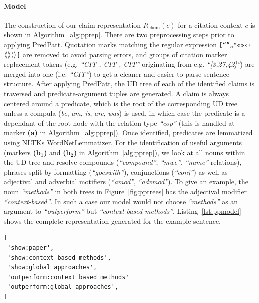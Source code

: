 \paragraph{Model} The construction of our claim representation $R_{\text{claim}}(c)$ for a citation context $c$ is shown in Algorithm~\ref{alg:pprep}. There are two preprocessing steps prior to applying PredPatt. Quotation marks matching the regular expression \texttt{[“”„"«»‹›$\mathtt{\langle\hspace{-1mm}\langle\rangle\hspace{-1mm}\rangle\langle\rangle}$]} are removed to avoid parsing errors, and groups of citation marker replacement tokens (e.g. \emph{``CIT , CIT , CIT''} originating from e.g. \emph{``[3,27,42]''}) are merged into one (i.e. \emph{``CIT''}) to get a cleaner and easier to parse sentence structure. After applying PredPatt, the UD tree of each of the identified claims is traversed and predicate-argument tuples are generated. A claim is always centered around a predicate, which is the root of the corresponding UD tree unless a compula (\emph{be}, \emph{am}, \emph{is}, \emph{are}, \emph{was}) is used, in which case the predicate is a dependant of the root node with the relation type \emph{``cop''} (this is handled at marker \textbf{(a)} in Algorithm~\ref{alg:pprep}). Once identified, predicates are lemmatized using NLTKs WordNetLemmatizer. For the identification of useful arguments (markers \textbf{(b$_\mathbf{1}$)} and \textbf{(b$_\mathbf{2}$)} in Algorithm~\ref{alg:pprep}), we look at all nouns within the UD tree and resolve compounds (\emph{``compound''}, \emph{``mwe''}, \emph{``name''} relations), phrases split by formatting (\emph{``goeswith''}), conjunctions (\emph{``conj''}) as well as adjectival and adverbial motifiers (\emph{``amod''}, \emph{``advmod''}). To give an example, the noun \emph{``methods''} in both trees in Figure~\ref{fig:pptrees} has the adjectival modifier \emph{``context-based''}. In such a case our model would not choose \emph{``methods''} as an argument to \emph{``outperform''} but \emph{``context-based methods''}. Listing~\ref{lst:ppmodel} shows the complete representation generated for the example sentence.

\begin{lstlisting}[caption={An example of $R_{\text{claim}}(c)$.},label={lst:ppmodel}]
[
 'show:paper',
 'show:context based methods',
 'show:global approaches',
 'outperform:context based methods'
 'outperform:global approaches',
]
\end{lstlisting}


